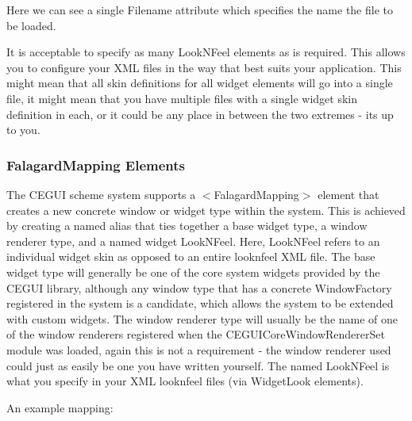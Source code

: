 Here we can see a single \textquotesingle{}Filename\textquotesingle{} attribute which specifies the name the file to be loaded.

It is acceptable to specify as many Look\+N\+Feel elements as is required. This allows you to configure your X\+ML files in the way that best suits your application. This might mean that all skin definitions for all widget elements will go into a single file, it might mean that you have multiple files with a single widget skin definition in each, or it could be any place in between the two extremes -\/ it\textquotesingle{}s up to you.\hypertarget{fal_intro_fal_mappings}{}\subsubsection{Falagard\+Mapping Elements}\label{fal_intro_fal_mappings}
The C\+E\+G\+UI scheme system supports a {\ttfamily $<$Falagard\+Mapping$>$} element that creates a new concrete window or widget type within the system. This is achieved by creating a named alias that ties together a base widget type, a window renderer type, and a named widget \textquotesingle{}Look\+N\+Feel\textquotesingle{}. Here, \textquotesingle{}Look\+N\+Feel\textquotesingle{} refers to an individual widget skin as opposed to an entire \textquotesingle{}looknfeel\textquotesingle{} X\+ML file. The base widget type will generally be one of the core system widgets provided by the C\+E\+G\+UI library, although any window type that has a concrete Window\+Factory registered in the system is a candidate, which allows the system to be extended with custom widgets. The window renderer type will usually be the name of one of the window renderers registered when the C\+E\+G\+U\+I\+Core\+Window\+Renderer\+Set module was loaded, again this is not a requirement -\/ the window renderer used could just as easily be one you have written yourself. The named \textquotesingle{}Look\+N\+Feel\textquotesingle{} is what you specify in your X\+ML looknfeel files (via Widget\+Look elements).

An example mapping\+: 
\begin{DoxyCode}{0}
\DoxyCodeLine{/>}
\end{DoxyCode}


